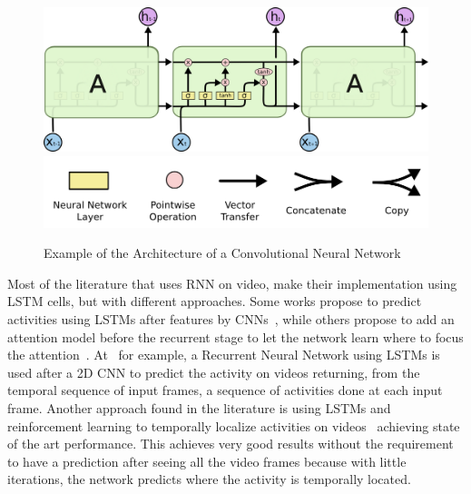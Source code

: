 

\begin{figure}[ht]
\begin{center}
\includegraphics[width=0.8\linewidth]{img/stateofart/lstm_chain}
\includegraphics[width=0.5\linewidth]{img/stateofart/lstm_legend}
\end{center}
\caption{Example of the Architecture of a Convolutional Neural Network}
\label{fig:lstm_chain}
\end{figure}

Most of the literature that uses RNN on video, make their implementation using LSTM cells, but with different approaches. Some works propose to predict activities using LSTMs after features by CNNs~\cite{yao2015describing}, while others propose to add an attention model before the recurrent stage to let the network learn where to focus the attention~\cite{sharma2015action,piergiovanni2016temporal}. At~\cite{yeung2015every} for example, a Recurrent Neural Network using LSTMs is used after a 2D CNN to predict the activity on videos returning, from the temporal sequence of input frames, a sequence of activities done at each input frame.
Another approach found in the literature is using LSTMs and reinforcement learning to temporally localize activities on videos~\cite{yeung2015end} achieving state of the art performance. This achieves very good results without the requirement to have a prediction after seeing all the video frames because with little iterations, the network predicts where the activity is temporally located.

